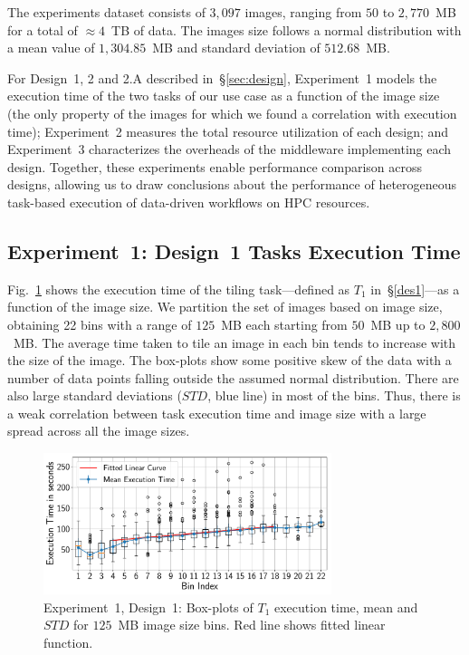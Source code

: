 The experiments dataset consists of $3,097$ images, ranging from $50$ to
$2,770$~MB for a total of $\approx4$~TB of data. The images size follows a
normal distribution with a mean value of $1,304.85$~MB and standard deviation
of $512.68$~MB.

For Design~1, 2 and 2.A described in~\S\ref{sec:design}, Experiment~1 models
the execution time of the two tasks of our use case as a function of the image
size (the only property of the images for which we found a correlation with
execution time); Experiment~2 measures the total resource utilization of each
design; and Experiment~3 characterizes the overheads of the middleware
implementing each design. Together, these experiments enable performance
comparison across designs, allowing us to draw conclusions about the
performance of heterogeneous task-based execution of data-driven workflows on
HPC resources.

\subsection{Experiment~1: Design~1 Tasks Execution Time}
\label{ssec:des1analysis}

Fig.~\ref{fig:stage_0_execution} shows the execution time of the tiling
task---defined as $T_{1}$ in~\S\ref{des1}---as a function of the image size.
We partition the set of images based on image size, obtaining 22 bins with a
range of $125$~MB each starting from $50$~MB up to $2,800$~MB. The average
time taken to tile an image in each bin tends to increase with the size of the
image. The box-plots show some positive skew of the data with a number of data
points  falling outside the assumed normal distribution. There are also large
standard deviations ($STD$, blue line) in most of the bins. Thus, there is a
weak correlation between task execution time and image size with a large
spread  across all the image sizes.

\begin{figure}[t]
    \centering
    \includegraphics[width=0.75\textwidth]{figures/designs/stage_0_tx_box.pdf}
    \caption{Experiment~1, Design~1: Box-plots of $T_{1}$ execution time, mean
    and $STD$ for $125$~MB image size bins.
        Red line shows fitted linear function.}\label{fig:stage_0_execution}
\end{figure}

